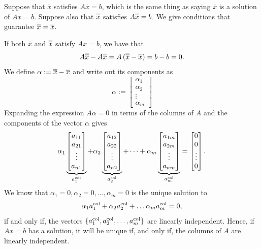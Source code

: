 Suppose that $\overline{x}$ satisfies $A \overline{x} =b$, which is the same thing as saying $\overline{x}$ is a solution of $Ax=b$. Suppose also that $\doverline{x}$ satisfies $A \doverline{x} =b$. We give conditions that guarantee
$ \doverline{x} =\overline{x}.$

\begin{tcolorbox}

If both $\overline{x}$ and  $\doverline{x}$ satisfy $Ax=b$, we have that
$$A\doverline{x} - A \overline{x} = A \left(\doverline{x} - \overline{x} \right) =  b - b =0.$$
We define $\alpha:=\doverline{x} - \overline{x}$ and write out its components as
$$\alpha := \left[ \begin{array}{c} \alpha_1 \\ \alpha_2 \\ \vdots \\ \alpha_m  \end{array} \right] $$
Expanding the expression $A \alpha = 0$ in terms of the columns of $A$ and the components of the vector $\alpha$ gives
\begin{equation}
    \label{eq:UniquenessSolutionsNonsquare_02}
\alpha_1 \underbrace{\begin{bmatrix} a_{11} \\ a_{21}\\ \vdots \\ a_{n1} \end{bmatrix}}_{a^{\rm col}_1}+ \alpha_2 \underbrace{\begin{bmatrix} a_{12} \\ a_{22}\\ \vdots \\ a_{n2} \end{bmatrix}}_{a^{\rm col}_2} + \cdots + \alpha_m \underbrace{\begin{bmatrix} a_{1m} \\ a_{2m}\\ \vdots \\ a_{nm} \end{bmatrix}}_{a^{\rm col}_m} = \begin{bmatrix} 0 \\ 0\\ \vdots \\ 0 \end{bmatrix}.
\end{equation}
We know that $\alpha_1=0, \alpha_2=0, \ldots, \alpha_m=0$ is the unique solution to 
$$\alpha_1 a^{\rm col}_1 + \alpha_2 a^{\rm col}_2 + \ldots \alpha_m a^{\rm col}_m = 0,$$
if and only if, the vectors $\{a^{\rm col}_1, a^{\rm col}_2, \ldots, a^{\rm col}_m \} $ are linearly independent. Hence, if $Ax=b$ has a solution, it will be unique if, and only if, the columns of $A$ are linearly independent.

\end{tcolorbox}

